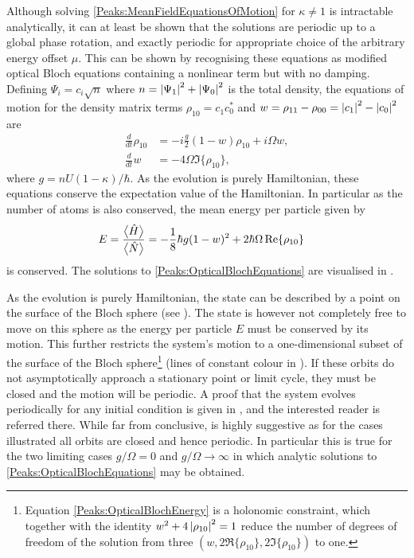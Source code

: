 Although solving \eqref{Peaks:MeanFieldEquationsOfMotion} for $\kappa \neq 1$ is intractable analytically, it can at least be shown that the solutions are periodic up to a global phase rotation, and exactly periodic for appropriate choice of the arbitrary energy offset $\mu$. This can be shown by recognising these equations as modified optical Bloch equations containing a nonlinear term but with no damping. Defining $\Psi_i = c_i\sqrt{n}$ where $n = \left|\Psi_1\right|^2 + \left|\Psi_0\right|^2$ is the total density, the equations of motion for the density matrix terms $\rho_{10} = c_{1}^{}c_{0}^*$ and $w = \rho_{11}-\rho_{00} = \left|c_1\right|^2 - \left|c_0\right|^2$ are
\begin{subequations}
    \label{Peaks:OpticalBlochEquations}
    \begin{align}
        \frac{d}{dt}\rho_{10} &= -i\frac{g}{2} (1-w)\rho_{10} + i \Omega w,\\
        \frac{d }{dt}w &= -4 \Omega \Im\{\rho_{10}\},
    \end{align}
\end{subequations}
where $g = n U (1-\kappa)/\hbar$. As the evolution is purely Hamiltonian, these equations conserve the expectation value of the Hamiltonian. In particular as the number of atoms is also conserved, the mean energy per particle given by
\begin{align}
    E &= \frac{\mean{\hat{H}}}{\mean{\hat{N}}} = -\frac{1}{8}\hbar g(1 - w)^2 + 2 \hbar \Omega \Re\{\rho_{10}\}
    \label{Peaks:OpticalBlochEnergy}
\end{align}
is conserved. The solutions to \eqref{Peaks:OpticalBlochEquations} are visualised in .

As the evolution is purely Hamiltonian, the state can be described by a point on the surface of the Bloch sphere (see ).  The state is however not completely free to move on this sphere as the energy per particle $E$ must be conserved by its motion. This further restricts the system's motion to a one-dimensional subset of the surface of the Bloch sphere\footnote{Equation \eqref{Peaks:OpticalBlochEnergy} is a holonomic constraint, which together with the identity $w^2 + 4 \left|\rho_{10}\right|^2=1$ reduce the number of degrees of freedom of the solution from three $(w, 2\Re\{\rho_{10}\}, 2\Im\{\rho_{10}\})$ to one.} (lines of constant colour in ). If these orbits do not asymptotically approach a stationary point or limit cycle, they must be closed and the motion will be periodic. A proof that the system evolves periodically for any initial condition is given in , and the interested reader is referred there. While far from conclusive,  is highly suggestive as for the cases illustrated all orbits are closed and hence periodic. In particular this is true for the two limiting cases $g/\Omega = 0$ and $g/\Omega \rightarrow \infty$ in which analytic solutions to \eqref{Peaks:OpticalBlochEquations} may be obtained.

